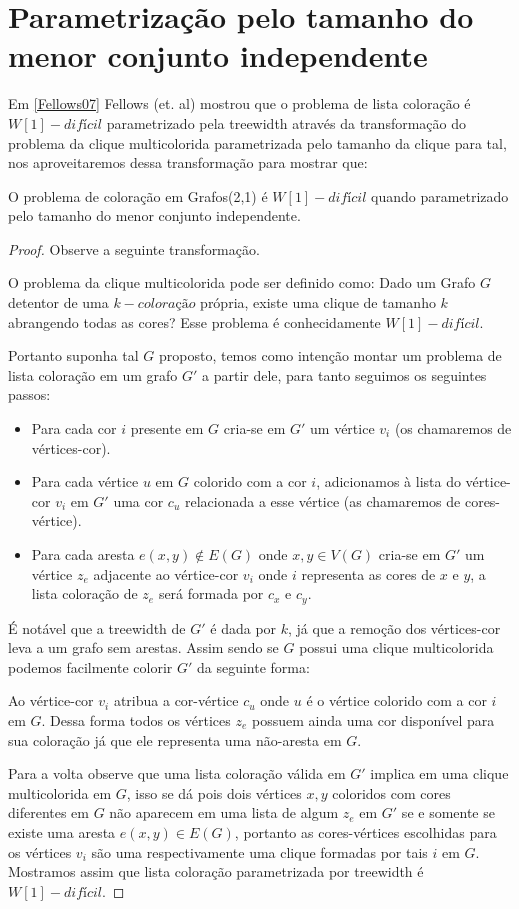 \section{Parametrização pelo tamanho do menor conjunto independente}
Em \ref{Fellows07} Fellows (et. al) mostrou que o problema de lista coloração é $W[1]-difícil$ parametrizado pela treewidth através da transformação do problema da clique multicolorida parametrizada pelo tamanho da clique para tal, nos aproveitaremos dessa transformação para mostrar que:
\begin{teorema}
O problema de coloração em Grafos(2,1) é $W[1]-difícil$ quando parametrizado pelo tamanho do menor conjunto independente.
\end{teorema}
\begin{proof}
Observe a seguinte transformação.

O problema da clique multicolorida pode ser definido como: Dado um Grafo $G$ detentor de uma $k-coloração$ própria, existe uma clique de tamanho $k$ abrangendo todas as cores? Esse problema é conhecidamente $W[1]-difícil$.

Portanto suponha tal $G$ proposto, temos como intenção montar um problema de lista coloração em um grafo $G'$ a partir dele, para tanto seguimos os seguintes passos:
\begin{itemize}
  \item Para cada cor $i$ presente em $G$ cria-se em $G'$ um vértice $v_i$ (os chamaremos de vértices-cor).
  \item Para cada vértice $u$ em $G$ colorido com a cor $i$, adicionamos à lista do vértice-cor $v_i$ em $G'$ uma cor $c_u$ relacionada a esse vértice (as chamaremos de cores-vértice).
  \item Para cada aresta $e(x,y) \notin E(G)$ onde $x,y \in V(G)$ cria-se em $G'$ um vértice $z_e$ adjacente ao vértice-cor $v_i$ onde $i$ representa as cores de $x$ e $y$, a lista coloração de $z_e$ será formada por $c_x$ e $c_y$.
\end{itemize}
É notável que a treewidth de $G'$ é dada por $k$, já que a remoção dos vértices-cor leva a um grafo sem arestas. Assim sendo se $G$ possui uma clique multicolorida podemos facilmente colorir $G'$ da seguinte forma:

Ao vértice-cor $v_i$ atribua a cor-vértice $c_u$ onde $u$ é o vértice colorido com a cor $i$ em $G$. Dessa forma todos os vértices $z_e$ possuem ainda uma cor disponível para sua coloração já que ele representa uma não-aresta em $G$. 

Para a volta observe que uma lista coloração válida em $G'$ implica em uma clique multicolorida em $G$, isso se dá pois dois vértices $x,y$ coloridos com cores diferentes em $G$ não aparecem em uma lista de algum $z_e$ em $G'$ se e somente se existe uma aresta $e(x,y) \in E(G)$, portanto as cores-vértices escolhidas para os vértices $v_i$ são uma respectivamente uma clique formadas por tais $i$ em $G$. Mostramos assim que lista coloração parametrizada por treewidth é $W[1]-difícil$.


\end{proof}
